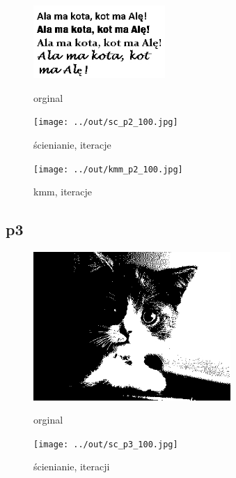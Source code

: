 \documentclass[a4paper,12pt]{article}
\begin{document}
\begin{figure}[h!]
\begin{minipage}[t]{5cm}
\begin{center}
\includegraphics[width=5cm]{../in/p2.jpg}
\caption{orginal}
\end{center}
\end{minipage}
\hfill
\begin{minipage}[t]{5cm}
\begin{center}
\texttt{[image: ../out/sc\_p2\_100.jpg]}
\caption{ścienianie, \protect iteracje}
\end{center}
\end{minipage}
\hfill
\begin{minipage}[t]{5cm}
\begin{center}
\texttt{[image: ../out/kmm\_p2\_100.jpg]}
\caption{kmm, \protect iteracje}
\end{center}
\end{minipage}
\end{figure}



\newpage
\subsection{p3}

\begin{figure}[h!]
\begin{minipage}[t]{7.5cm}
\begin{center}
\includegraphics[width=7.5cm]{../in/p3.jpg}
\caption{orginal}
\end{center}
\end{minipage}
\hfill
\begin{minipage}[t]{7.5cm}
\begin{center}
\texttt{[image: ../out/sc\_p3\_100.jpg]}
\caption{ścienianie, \protect iteracji}
\end{center}
\end{minipage}
\end{figure}
\end{document}
